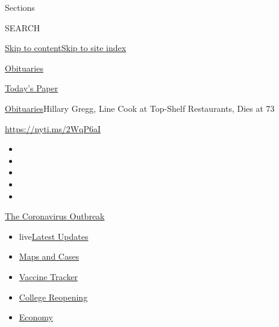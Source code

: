 Sections

SEARCH

\protect\hyperlink{site-content}{Skip to
content}\protect\hyperlink{site-index}{Skip to site index}

\href{https://www.nytimes.com/section/obituaries}{Obituaries}

\href{https://myaccount.nytimes.com/auth/login?response_type=cookie\&client_id=vi}{}

\href{https://www.nytimes.com/section/todayspaper}{Today's Paper}

\href{/section/obituaries}{Obituaries}\textbar{}Hillary Gregg, Line Cook
at Top-Shelf Restaurants, Dies at 73

\url{https://nyti.ms/2WqP6aI}

\begin{itemize}
\item
\item
\item
\item
\item
\end{itemize}

\href{https://www.nytimes.com/news-event/coronavirus?action=click\&pgtype=Article\&state=default\&region=TOP_BANNER\&context=storylines_menu}{The
Coronavirus Outbreak}

\begin{itemize}
\tightlist
\item
  live\href{https://www.nytimes.com/2020/08/03/world/coronavirus-covid-19.html?action=click\&pgtype=Article\&state=default\&region=TOP_BANNER\&context=storylines_menu}{Latest
  Updates}
\item
  \href{https://www.nytimes.com/interactive/2020/us/coronavirus-us-cases.html?action=click\&pgtype=Article\&state=default\&region=TOP_BANNER\&context=storylines_menu}{Maps
  and Cases}
\item
  \href{https://www.nytimes.com/interactive/2020/science/coronavirus-vaccine-tracker.html?action=click\&pgtype=Article\&state=default\&region=TOP_BANNER\&context=storylines_menu}{Vaccine
  Tracker}
\item
  \href{https://www.nytimes.com/2020/08/02/us/covid-college-reopening.html?action=click\&pgtype=Article\&state=default\&region=TOP_BANNER\&context=storylines_menu}{College
  Reopening}
\item
  \href{https://www.nytimes.com/live/2020/08/03/business/stock-market-today-coronavirus?action=click\&pgtype=Article\&state=default\&region=TOP_BANNER\&context=storylines_menu}{Economy}
\end{itemize}

